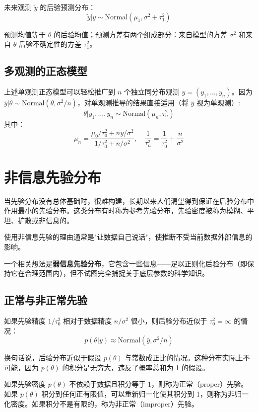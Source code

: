 未来观测 $\tilde{y}$ 的后验预测分布：
\[
\tilde{y}|y \sim \text{Normal}(\mu_1, \sigma^2 + \tau_1^2)
\]

预测均值等于 $\theta$ 的后验均值；预测方差有两个组成部分：来自模型的方差 $\sigma^2$ 和来自 $\theta$ 后验不确定性的方差 $\tau_1^2$。

\subsection{多观测的正态模型}

上述单观测正态模型可以轻松推广到 $n$ 个独立同分布观测 $y = (y_1, \ldots, y_n)$。因为 $\bar{y}|\theta \sim \text{Normal}(\theta, \sigma^2/n)$，对单观测推导的结果直接适用（将 $\bar{y}$ 视为单观测）:
\[
\theta|y_1,\ldots,y_n \sim \text{Normal}(\mu_n, \tau_n^2)
\]
其中：
\[
\mu_n = \frac{\mu_0/\tau_0^2 + n\bar{y}/\sigma^2}{1/\tau_0^2 + n/\sigma^2}, \quad
\frac{1}{\tau_n^2} = \frac{1}{\tau_0^2} + \frac{n}{\sigma^2}
\]

\section{非信息先验分布}

当先验分布没有总体基础时，很难构建，长期以来人们渴望得到保证在后验分布中作用最小的先验分布。这类分布有时称为参考先验分布，先验密度被称为模糊、平坦、扩散或非信息的。

使用非信息先验的理由通常是"让数据自己说话"，使推断不受当前数据外部信息的影响。

一个相关想法是\textbf{弱信息先验分布}，它包含一些信息——足以正则化后验分布（即保持它在合理范围内），但不试图完全捕捉关于底层参数的科学知识。

\subsection{正常与非正常先验}

如果先验精度 $1/\tau_0^2$ 相对于数据精度 $n/\sigma^2$ 很小，则后验分布近似于 $\tau_0^2 = \infty$ 的情况：
\[
p(\theta|y) \approx \text{Normal}(\bar{y}, \sigma^2/n)
\]

换句话说，后验分布近似于假设 $p(\theta)$ 与常数成正比的情况。这种分布实际上不可能，因为 $p(\theta)$ 的积分是无穷大，违反了概率总和为 1 的假设。

\begin{Definition}
  如果先验密度 $p(\theta)$ 不依赖于数据且积分等于 1，则称为正常（proper）先验。如果 $p(\theta)$ 积分到任何正有限值，可以重新归一化使其积分到 1，则称为非归一化密度。如果积分不是有限的，称为非正常（improper）先验。
\end{Definition}

